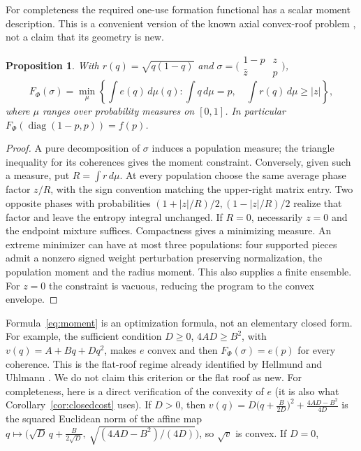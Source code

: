 \documentclass[11pt]{article}
\newtheorem{proposition}[theorem]{Proposition}
\begin{document}
For completeness the required one-use formation functional has a scalar
moment description. This is a convenient version of the known axial
convex-roof problem \cite{hu}, not a claim that its geometry is new.
\begin{proposition}\label{prop:moment}
With $r(q)=\sqrt{q(1-q)}$ and
$\sigma=\bigl(\begin{smallmatrix}1-p&z\\\bar z&p\end{smallmatrix}\bigr)$,
\begin{equation}\label{eq:moment}
 F_\Phi(\sigma)=\min_\mu\left\{\int e(q)\,d\mu(q):
       \int q\,d\mu=p,\quad\int r(q)\,d\mu\ge|z|\right\},
\end{equation}
where $\mu$ ranges over probability measures on $[0,1]$.
In particular $F_\Phi(\operatorname{diag}(1-p,p))=f(p)$.
\end{proposition}
\begin{proof}
A pure decomposition of $\sigma$ induces a population measure; the triangle
inequality for its coherences gives the moment constraint. Conversely, given
such a measure, put $R=\int r\,d\mu$. At every population choose the same
average phase factor $z/R$, with the sign convention matching the upper-right
matrix entry. Two opposite phases with probabilities
$(1+|z|/R)/2,(1-|z|/R)/2$ realize that factor and leave the entropy integral
unchanged. If $R=0$, necessarily $z=0$ and the endpoint mixture suffices.
Compactness gives a minimizing measure. An extreme minimizer can have at
most three populations: four supported pieces admit a nonzero signed weight
perturbation preserving normalization, the population moment and the radius
moment. This also supplies a finite ensemble. For $z=0$ the constraint is
vacuous, reducing the program to the convex envelope.
\end{proof}
Formula~\eqref{eq:moment} is an optimization formula, not an elementary closed
form. For example, the sufficient condition $D\ge0$, $4AD\ge B^2$, with
$v(q)=A+Bq+Dq^2$, makes $e$ convex and then $F_\Phi(\sigma)=e(p)$ for every
coherence. This is the flat-roof regime already identified by Hellmund and
Uhlmann \cite[Theorem 2 and Sections IV.C--D]{hu}. We do not claim this
criterion or the flat roof as new. For completeness, here is a direct
verification of the convexity of $e$ (it is also what Corollary~\ref{cor:closedcost} uses).
If $D>0$, then
$v(q)=D\bigl(q+\tfrac B{2D}\bigr)^2+\tfrac{4AD-B^2}{4D}$ is the squared Euclidean norm of the
affine map $q\mapsto\bigl(\sqrt D\,q+\tfrac B{2\sqrt D},\ \sqrt{(4AD-B^2)/(4D)}\bigr)$, so $\sqrt v$ is convex. If $D=0$,
\end{document}
